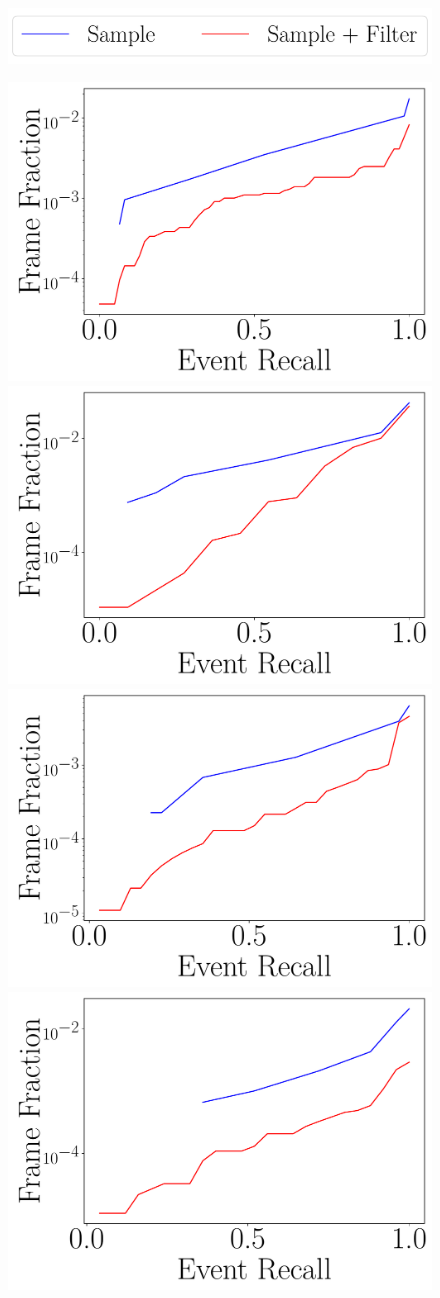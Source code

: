   
\begin{figure}
    \centering
    \includegraphics[width=0.7\linewidth]{FIGS/fig-recall-frame-aggregated-legend.pdf}

    \includegraphics[trim={0.5cm 0.5cm 0 0},clip,width=0.47\linewidth]{FIGS/fig-random-select-and-filter-recall-frame-okutama-aggregated.pdf}
    \includegraphics[trim={0.5cm 0.5cm 0
      0},clip,width=0.47\linewidth]{FIGS/fig-random-select-and-filter-recall-frame-stanford-aggregated.pdf}
    \includegraphics[trim={0.5cm 0.5cm 0 0},clip,width=0.47\linewidth]{FIGS/fig-random-select-and-filter-recall-frame-raft-aggregated.pdf}
    \includegraphics[trim={0.5cm 0.5cm 0 0},clip,width=0.47\linewidth]{FIGS/fig-random-select-and-filter-recall-frame-elephant-aggregated.pdf}


\end{figure}
